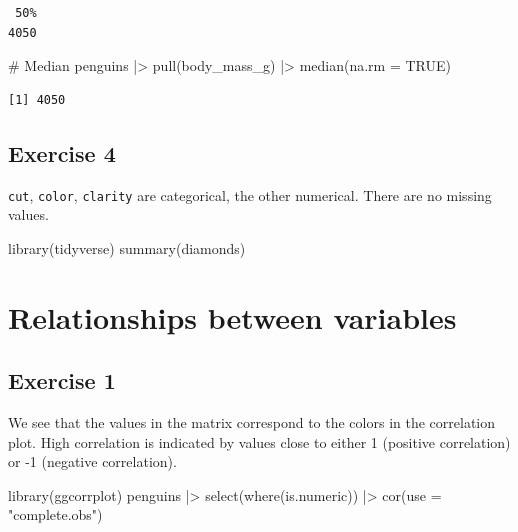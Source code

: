 \documentclass[
  letterpaper,
  DIV=11,
  numbers=noendperiod]{scrreprt}
\newenvironment{Shaded}{\begin{snugshade}}{\end{snugshade}}
\newcommand{\AttributeTok}[1]{\textcolor[rgb]{0.40,0.45,0.13}{#1}}
\newcommand{\CommentTok}[1]{\textcolor[rgb]{0.37,0.37,0.37}{#1}}
\newcommand{\ConstantTok}[1]{\textcolor[rgb]{0.56,0.35,0.01}{#1}}
\newcommand{\FunctionTok}[1]{\textcolor[rgb]{0.28,0.35,0.67}{#1}}
\newcommand{\NormalTok}[1]{\textcolor[rgb]{0.00,0.23,0.31}{#1}}
\newcommand{\SpecialCharTok}[1]{\textcolor[rgb]{0.37,0.37,0.37}{#1}}
\newcommand{\StringTok}[1]{\textcolor[rgb]{0.13,0.47,0.30}{#1}}
\begin{document}
\begin{verbatim}
 50% 
4050 
\end{verbatim}

\begin{Shaded}
\begin{Highlighting}[]
\CommentTok{\# Median}
\NormalTok{penguins }\SpecialCharTok{|\textgreater{}} 
  \FunctionTok{pull}\NormalTok{(body\_mass\_g) }\SpecialCharTok{|\textgreater{}} 
  \FunctionTok{median}\NormalTok{(}\AttributeTok{na.rm =} \ConstantTok{TRUE}\NormalTok{)}
\end{Highlighting}
\end{Shaded}

\begin{verbatim}
[1] 4050
\end{verbatim}

\subsection{Exercise 4}\label{exercise-4-2}

\texttt{cut}, \texttt{color}, \texttt{clarity} are categorical, the
other numerical. There are no missing values.

\begin{Shaded}
\begin{Highlighting}[]
\FunctionTok{library}\NormalTok{(tidyverse)}
\FunctionTok{summary}\NormalTok{(diamonds)}
\end{Highlighting}
\end{Shaded}

\section{Relationships between
variables}\label{relationships-between-variables}

\subsection{Exercise 1}\label{exercise-1-6}

We see that the values in the matrix correspond to the colors in the
correlation plot. High correlation is indicated by values close to
either 1 (positive correlation) or -1 (negative correlation).

\begin{Shaded}
\begin{Highlighting}[]
\FunctionTok{library}\NormalTok{(ggcorrplot)}
\NormalTok{penguins }\SpecialCharTok{|\textgreater{}}
  \FunctionTok{select}\NormalTok{(}\FunctionTok{where}\NormalTok{(is.numeric)) }\SpecialCharTok{|\textgreater{}}
  \FunctionTok{cor}\NormalTok{(}\AttributeTok{use =} \StringTok{"complete.obs"}\NormalTok{)}
\end{Highlighting}
\end{Shaded}
\end{document}

